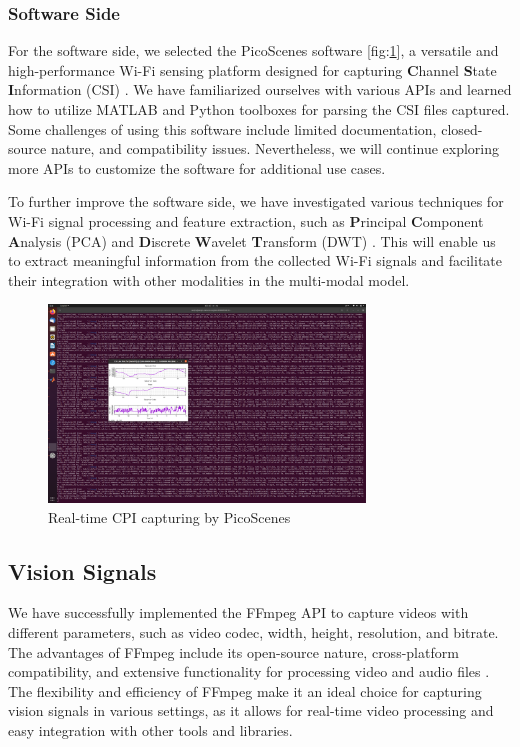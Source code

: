 \documentclass[12pt, a4paper]{article}
\newcommand{\figref}[1]{[fig:\ref{#1}]}
\begin{document}
\subsubsection{Software Side}
For the software side, we selected the PicoScenes software \figref{fig:picoscenes}, a versatile and high-performance Wi-Fi sensing platform designed for capturing \textbf{C}hannel \textbf{S}tate \textbf{I}nformation (CSI) \cite{jiang2022picoscenes}. We have familiarized ourselves with various APIs and learned how to utilize MATLAB and Python toolboxes for parsing the CSI files captured. Some challenges of using this software include limited documentation, closed-source nature, and compatibility issues. Nevertheless, we will continue exploring more APIs to customize the software for additional use cases.

To further improve the software side, we have investigated various techniques for Wi-Fi signal processing and feature extraction, such as \textbf{P}rincipal \textbf{C}omponent \textbf{A}nalysis (PCA) and \textbf{D}iscrete \textbf{W}avelet \textbf{T}ransform (DWT) \cite{palipana2018falldefi}. This will enable us to extract meaningful information from the collected Wi-Fi signals and facilitate their integration with other modalities in the multi-modal model.

\begin{figure}[ht!]
    \centering
    \includegraphics[width=0.75\textwidth]{image/PicoScenes.png}
    \caption{Real-time CPI capturing by PicoScenes}
    \label{fig:picoscenes}
\end{figure}

\subsection{Vision Signals}
We have successfully implemented the FFmpeg API to capture videos with different parameters, such as video codec, width, height, resolution, and bitrate. The advantages of FFmpeg include its open-source nature, cross-platform compatibility, and extensive functionality for processing video and audio files \cite{tomar2006converting}. The flexibility and efficiency of FFmpeg make it an ideal choice for capturing vision signals in various settings, as it allows for real-time video processing and easy integration with other tools and libraries.
\end{document}
